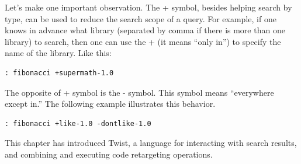 Let's make one important observation. The + symbol, besides helping search by type, can be used to reduce the search scope of a query. For example, if one knows in advance what library (separated by comma if there is more than one library) to search, then one can use the + (it means ``only in'') to specify the name of the library. Like this:

\begin{verbatim}
: fibonacci +supermath-1.0 
\end{verbatim}

The opposite of + symbol is the - symbol. This symbol means ``everywhere except in.'' The following example illustrates this behavior.

\begin{verbatim}
: fibonacci +like-1.0 -dontlike-1.0
\end{verbatim}
 
 
This chapter has introduced Twist, a language for interacting with search results, and combining and executing code retargeting operations. 
